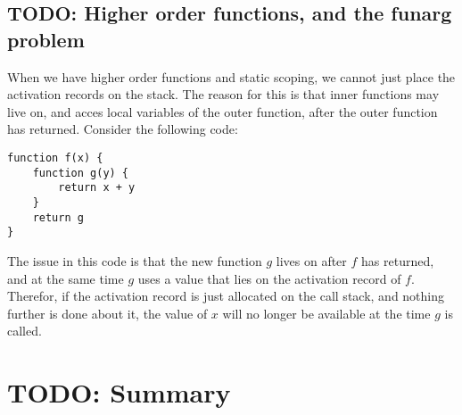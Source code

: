 \subsection{TODO: Higher order functions, and the funarg problem}
When we have higher order functions and static scoping, we cannot just place the activation records on the stack. The reason for this is that inner functions may live on, and acces local variables of the outer function, after the outer function has returned. Consider the following code:
\begin{verbatim}
function f(x) {
    function g(y) {
        return x + y
    }
    return g
}
\end{verbatim}

The issue in this code is that the new function $g$ lives on after $f$ has returned, and at the same time $g$ uses a value that lies on the activation record of $f$. Therefor, if the activation record is just allocated on the call stack, and nothing further is done about it, the value of $x$ will no longer be available at the time $g$ is called.


\label{funarg}





\section{TODO: Summary}
